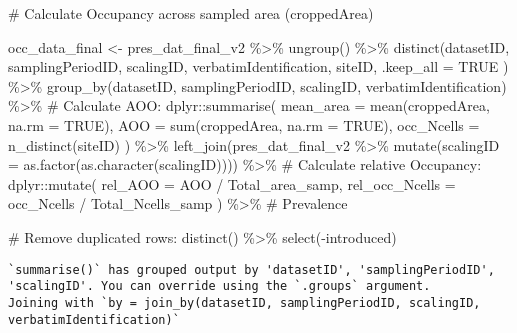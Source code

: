 \documentclass[
  letterpaper,
  DIV=11,
  numbers=noendperiod]{scrreprt}
\newenvironment{Shaded}{\begin{snugshade}}{\end{snugshade}}
\newcommand{\AttributeTok}[1]{\textcolor[rgb]{0.40,0.45,0.13}{#1}}
\newcommand{\CommentTok}[1]{\textcolor[rgb]{0.37,0.37,0.37}{#1}}
\newcommand{\ConstantTok}[1]{\textcolor[rgb]{0.56,0.35,0.01}{#1}}
\newcommand{\FunctionTok}[1]{\textcolor[rgb]{0.28,0.35,0.67}{#1}}
\newcommand{\NormalTok}[1]{\textcolor[rgb]{0.00,0.23,0.31}{#1}}
\newcommand{\OtherTok}[1]{\textcolor[rgb]{0.00,0.23,0.31}{#1}}
\newcommand{\SpecialCharTok}[1]{\textcolor[rgb]{0.37,0.37,0.37}{#1}}
\begin{document}
\begin{Shaded}
\begin{Highlighting}[]
\CommentTok{\# Calculate Occupancy across sampled area (croppedArea)}

\NormalTok{occ\_data\_final }\OtherTok{\textless{}{-}}\NormalTok{ pres\_dat\_final\_v2 }\SpecialCharTok{\%\textgreater{}\%}
  \FunctionTok{ungroup}\NormalTok{() }\SpecialCharTok{\%\textgreater{}\%}
  \FunctionTok{distinct}\NormalTok{(datasetID, samplingPeriodID, scalingID,}
\NormalTok{    verbatimIdentification, siteID,}
    \AttributeTok{.keep\_all =} \ConstantTok{TRUE}
\NormalTok{  ) }\SpecialCharTok{\%\textgreater{}\%}
  \FunctionTok{group\_by}\NormalTok{(datasetID, samplingPeriodID, scalingID, verbatimIdentification) }\SpecialCharTok{\%\textgreater{}\%}
  \CommentTok{\# Calculate AOO:}
\NormalTok{  dplyr}\SpecialCharTok{::}\FunctionTok{summarise}\NormalTok{(}
    \AttributeTok{mean\_area =} \FunctionTok{mean}\NormalTok{(croppedArea, }\AttributeTok{na.rm =} \ConstantTok{TRUE}\NormalTok{),}
    \AttributeTok{AOO =} \FunctionTok{sum}\NormalTok{(croppedArea, }\AttributeTok{na.rm =} \ConstantTok{TRUE}\NormalTok{),}
    \AttributeTok{occ\_Ncells =} \FunctionTok{n\_distinct}\NormalTok{(siteID)}
\NormalTok{  ) }\SpecialCharTok{\%\textgreater{}\%}
  \FunctionTok{left\_join}\NormalTok{(pres\_dat\_final\_v2 }\SpecialCharTok{\%\textgreater{}\%}
    \FunctionTok{mutate}\NormalTok{(}\AttributeTok{scalingID =} \FunctionTok{as.factor}\NormalTok{(}\FunctionTok{as.character}\NormalTok{(scalingID)))) }\SpecialCharTok{\%\textgreater{}\%}
  \CommentTok{\# Calculate relative Occupancy:}
\NormalTok{  dplyr}\SpecialCharTok{::}\FunctionTok{mutate}\NormalTok{(}
    \AttributeTok{rel\_AOO =}\NormalTok{ AOO }\SpecialCharTok{/}\NormalTok{ Total\_area\_samp,}
    \AttributeTok{rel\_occ\_Ncells =}\NormalTok{ occ\_Ncells }\SpecialCharTok{/}\NormalTok{ Total\_Ncells\_samp}
\NormalTok{  ) }\SpecialCharTok{\%\textgreater{}\%} \CommentTok{\# Prevalence}

  \CommentTok{\# Remove duplicated rows:}
  \FunctionTok{distinct}\NormalTok{() }\SpecialCharTok{\%\textgreater{}\%}
  \FunctionTok{select}\NormalTok{(}\SpecialCharTok{{-}}\NormalTok{introduced)}
\end{Highlighting}
\end{Shaded}

\begin{verbatim}
`summarise()` has grouped output by 'datasetID', 'samplingPeriodID',
'scalingID'. You can override using the `.groups` argument.
Joining with `by = join_by(datasetID, samplingPeriodID, scalingID,
verbatimIdentification)`
\end{verbatim}
\end{document}
